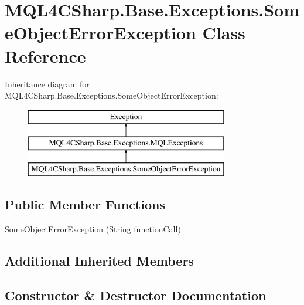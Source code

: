 \hypertarget{class_m_q_l4_c_sharp_1_1_base_1_1_exceptions_1_1_some_object_error_exception}{}\section{M\+Q\+L4\+C\+Sharp.\+Base.\+Exceptions.\+Some\+Object\+Error\+Exception Class Reference}
\label{class_m_q_l4_c_sharp_1_1_base_1_1_exceptions_1_1_some_object_error_exception}
Inheritance diagram for M\+Q\+L4\+C\+Sharp.\+Base.\+Exceptions.\+Some\+Object\+Error\+Exception\+:\begin{figure}[H]
\begin{center}
\leavevmode
\includegraphics[height=3.000000cm]{class_m_q_l4_c_sharp_1_1_base_1_1_exceptions_1_1_some_object_error_exception}
\end{center}
\end{figure}
\subsection*{Public Member Functions}
\begin{DoxyCompactItemize}
\item 
\hyperlink{class_m_q_l4_c_sharp_1_1_base_1_1_exceptions_1_1_some_object_error_exception_ac17edd6dabd2c84f2b8f70b4c5b5fdec}{Some\+Object\+Error\+Exception} (String function\+Call)
\end{DoxyCompactItemize}
\subsection*{Additional Inherited Members}


\subsection{Constructor \& Destructor Documentation}
